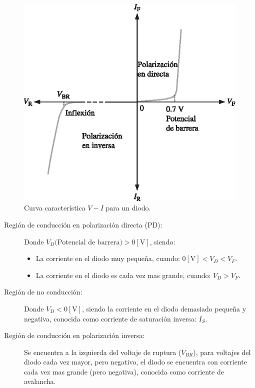 \documentclass[letter,twoside,11pt]{article}
\begin{document}
\begin{figure}[!h]
\centering
\includegraphics[scale=1.10]{figura1.eps}
\caption{Curva característica $V-I$ para un diodo.}
\label{curva}
\end{figure}

\begin{description}
    \item [Región de conducción en polarización directa (PD):]
        Donde $V_D \text{(Potencial de barrera)} > 0[\text{V}]$, siendo:
        \begin{itemize}
            \item La corriente en el diodo muy pequeña, cuando:
                $0[\text{V}] < V_D < V_F$.
            \item La corriente en el diodo es cada vez mas grande, cuando:
                $V_D > V_F$.
        \end{itemize}
    \item [Región de no conducción:]
        Donde $V_D < 0[\text{V}]$, siendo la corriente en el diodo demasiado
        pequeña y negativa, conocida como corriente de saturación inversa:
        $I_S$.
    \item [Región de conducción en polarización inversa:]
        Se encuentra a la izquierda del voltaje de ruptura ($V_{BR}$), para
        voltajes del diodo cada vez mayor, pero negativo, el diodo se encuentra
        con corriente cada vez mas grande (pero negativa), conocida como
        corriente de avalancha.
\end{description}
\end{document}
